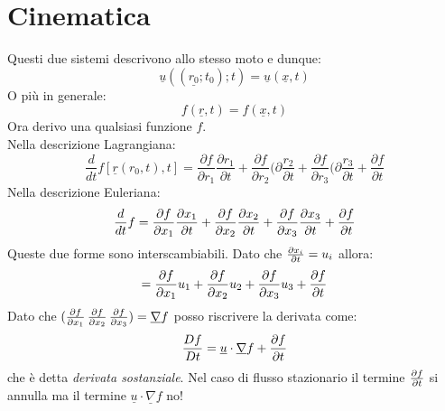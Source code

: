 \section{Cinematica}
Questi due sistemi descrivono allo stesso moto e dunque:
\begin{equation*}
  \underline{u}((\underline{r_0}; t_0); t) = \underline{u}(\underline{x},t)
\end{equation*}
O più in generale:
\begin{equation}
  f(\underline{r},t) = f(\underline{x},t)
\end{equation}
Ora derivo una qualsiasi funzione $ f $.\\
Nella descrizione Lagrangiana:
\begin{equation}
  \frac{d}{dt}f[\underline{r}(r_0,t),t] = \frac{\partial f}{\partial r_1} \frac{\partial r_1}{\partial t} + \frac{\partial f}{\partial r_2} (\partial \frac{r_2}{\partial t} + \frac{\partial f}{\partial r_3} (\partial \frac{r_3}{\partial t} + \frac{\partial f}{\partial t} 
\end{equation}
Nella descrizione Euleriana:
\begin{equation}
  \frac{d}{dt}f=\frac{\partial f}{\partial x_1}\frac{\partial x_1}{\partial t} + \frac{\partial f}{\partial x_2}\frac{\partial x_2}{\partial t} + \frac{\partial f}{\partial x_3}\frac{\partial x_3}{\partial t}+\frac{\partial f}{\partial t}
\end{equation}
Queste due forme sono interscambiabili. Dato che $ \frac{\partial x_i}{\partial t} = u_i $ allora:
\begin{equation*}
  = \frac{\partial f}{\partial x_1} u_1+\frac{\partial f}{\partial x_2}u_2+\frac{\partial f}{\partial x_3}u_3+\frac{\partial f}{\partial t}
\end{equation*}
Dato che $(\frac{\partial f}{\partial x_1} \, \frac{\partial f}{\partial x_2} \, \frac{\partial f}{\partial x_3}) = \underline{\nabla}f$ posso riscrivere la derivata come:
\begin{equation}
  \label{eq:derivata_sostanziale}
  \frac{Df}{Dt}=\underline{u}\cdot\underline{\nabla}f + \frac{\partial f}{\partial t}
\end{equation}
che è detta \emph{derivata sostanziale}.
Nel caso di flusso stazionario il termine $ \frac{\partial f}{\partial t} $ si annulla ma il termine $ \underline{u}\cdot\underline{\nabla}f $ no!
